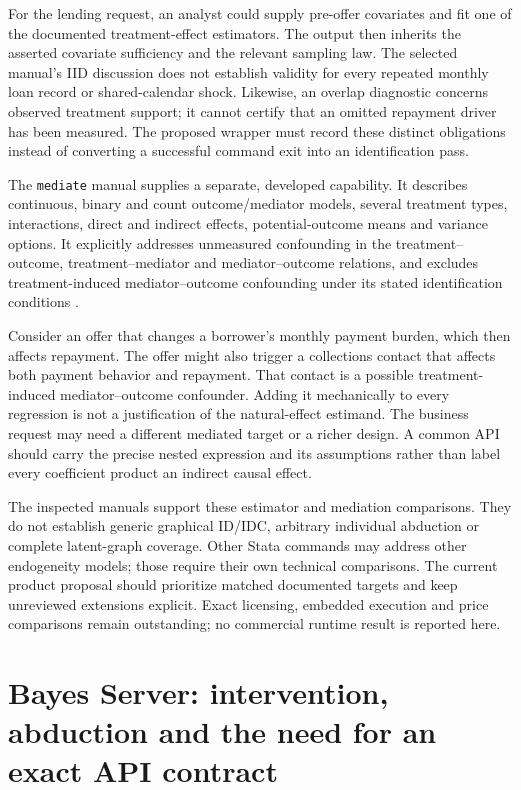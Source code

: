 For the lending request, an analyst could supply pre-offer covariates and fit
one of the documented treatment-effect estimators. The output then inherits
the asserted covariate sufficiency and the relevant sampling law. The selected
manual's IID discussion does not establish validity for every repeated monthly
loan record or shared-calendar shock. Likewise, an overlap diagnostic concerns
observed treatment support; it cannot certify that an omitted repayment driver
has been measured. The proposed wrapper must record these distinct obligations
instead of converting a successful command exit into an identification pass.

The \texttt{mediate} manual supplies a separate, developed capability. It
describes continuous, binary and count outcome/mediator models, several treatment
types, interactions, direct and indirect effects, potential-outcome means and
variance options. It explicitly addresses unmeasured confounding in the
treatment--outcome, treatment--mediator and mediator--outcome relations, and
excludes treatment-induced mediator--outcome confounding under its stated
identification conditions \citep{exec13_ci_stata_mediate}.

Consider an offer that changes a borrower's monthly payment burden, which then
affects repayment. The offer might also trigger a collections contact that
affects both payment behavior and repayment. That contact is a possible
treatment-induced mediator--outcome confounder. Adding it mechanically to every
regression is not a justification of the natural-effect estimand. The business
request may need a different mediated target or a richer design. A common API
should carry the precise nested expression and its assumptions rather than
label every coefficient product an indirect causal effect.

The inspected manuals support these estimator and mediation comparisons.
They do not establish generic graphical ID/IDC, arbitrary individual
abduction or complete latent-graph coverage. Other Stata commands may address
other endogeneity models; those require their own technical comparisons. The
current product proposal should prioritize matched documented targets and keep
unreviewed extensions explicit. Exact licensing, embedded execution and price
comparisons remain outstanding; no commercial runtime result is reported here.

\section{Bayes Server: intervention, abduction and the need for an exact API contract}

